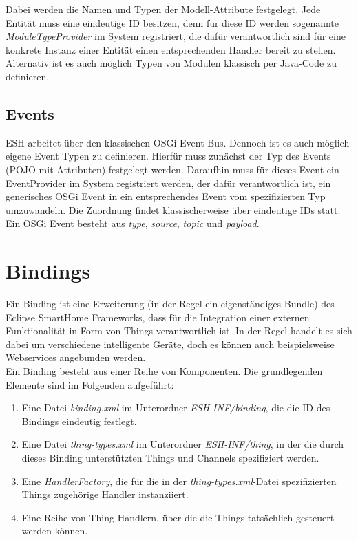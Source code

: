 Dabei werden die Namen und Typen der Modell-Attribute festgelegt. Jede Entität muss eine eindeutige ID besitzen, denn für diese ID werden sogenannte \textit{ModuleTypeProvider} im System registriert, die dafür verantwortlich sind für eine konkrete Instanz einer Entität einen entsprechenden Handler bereit zu stellen.\\

Alternativ ist es auch möglich Typen von Modulen klassisch per Java-Code zu definieren.

\subsection{Events}
ESH arbeitet über den klassischen OSGi Event Bus. Dennoch ist es auch möglich eigene Event Typen zu definieren. Hierfür muss zunächst der Typ des Events (POJO mit Attributen) festgelegt werden. Daraufhin muss für dieses Event ein EventProvider im System registriert werden, der dafür verantwortlich ist, ein generisches OSGi Event in ein entsprechendes Event vom spezifizierten Typ umzuwandeln. Die Zuordnung findet klassischerweise über eindeutige IDs statt. Ein OSGi Event besteht aus \textit{type}, \textit{source}, \textit{topic} und \textit{payload}.


\section{Bindings}
Ein Binding ist eine Erweiterung (in der Regel ein eigenständiges Bundle) des Eclipse SmartHome Frameworks, dass für die Integration einer externen Funktionalität in Form von Things verantwortlich ist. 
In der Regel handelt es sich dabei um verschiedene intelligente Geräte, doch es können auch beispielsweise Webservices angebunden werden.\\

Ein Binding besteht aus einer Reihe von Komponenten. Die grundlegenden Elemente sind im Folgenden aufgeführt:

\begin{enumerate}
\item Eine Datei \textit{binding.xml} im Unterordner \textit{ESH-INF/binding}, die die ID des Bindings eindeutig festlegt.
\item Eine Datei \textit{thing-types.xml} im Unterordner \textit{ESH-INF/thing}, in der die durch dieses Binding unterstützten Things und Channels spezifiziert werden.
\item Eine \textit{HandlerFactory}, die für die in der \textit{thing-types.xml}-Datei spezifizierten Things zugehörige Handler instanziiert.
\item Eine Reihe von Thing-Handlern, über die die Things tatsächlich gesteuert werden können.
\end{enumerate}


